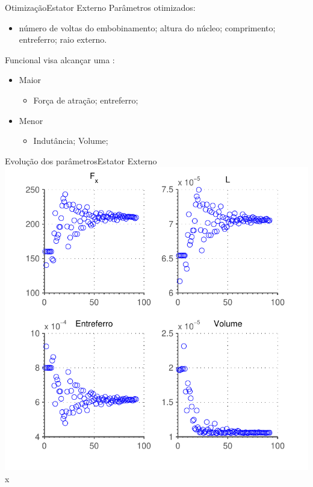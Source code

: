 \documentclass{beamer}
\begin{document}
\begin{frame}{Otimização}{Estator Externo}
Parâmetros otimizados:
\begin{itemize}
	\item número de voltas do embobinamento; altura do núcleo; comprimento; entreferro; raio externo.
\end{itemize}

Funcional visa alcançar uma :
\begin{itemize}
	\item Maior
		\begin{itemize}
		\item Força de atração; entreferro; 
		\end{itemize}
	\item Menor
		\begin{itemize}
		\item Indutância; Volume; 
		\end{itemize}
\end{itemize} 
\end{frame}

\begin{frame}{Evolução dos parâmetros}{Estator Externo}
\centering
\includegraphics[width=0.8\linewidth]{Simulacoes/Ativo/otimizacao_ativo_parametros}x
\end{frame}
\end{document}

